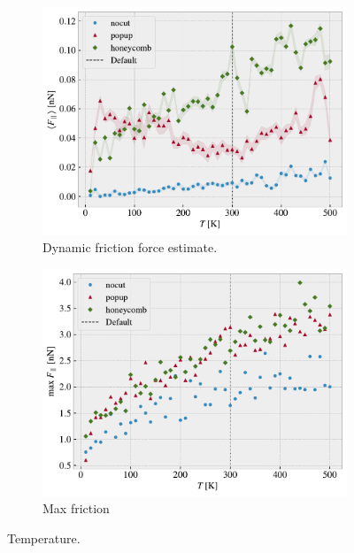 \begin{figure}[H]
  \centering
  \begin{subfigure}[t]{0.49\textwidth}
      \centering
      \includegraphics[width=\textwidth]{figures/baseline/variables_temp_mean_fixmove_v20.pdf}
      \caption{Dynamic friction force estimate.}
      \label{fig:var_temp_mean}
  \end{subfigure}
  \hfill
  \begin{subfigure}[t]{0.49\textwidth}
      \centering
      \includegraphics[width=\textwidth]{figures/baseline/variables_temp_max_fixmove_v20.pdf}
      \caption{Max friction}
      \label{fig:var_temp_max}
  \end{subfigure}
  \hfill
     \caption{Temperature.}
     \label{fig:var_temp}
\end{figure}



